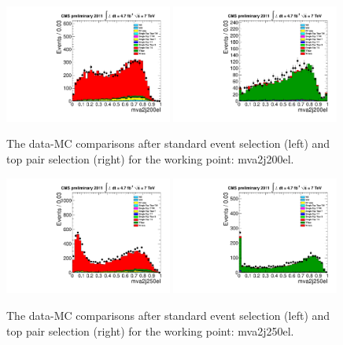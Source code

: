 \begin{figure}[!t]
  \centering
  \includegraphics[width=0.49\textwidth]{figs/cl-mva2j200el-normal.pdf}
  \includegraphics[width=0.49\textwidth]{figs/cl-mva2j200el-inTTbar.pdf}
  \caption{\label{fig:mva:plots-mva2j200el} The data-MC comparisons
    after standard event selection (left) and top pair
    selection (right) for the working point: mva2j200el.}
\end{figure}

\begin{figure}[!t]
  \centering
  \includegraphics[width=0.49\textwidth]{figs/cl-mva2j250el-normal.pdf}
  \includegraphics[width=0.49\textwidth]{figs/cl-mva2j250el-inTTbar.pdf}
  \caption{\label{fig:mva:plots-mva2j250el} The data-MC comparisons
    after standard event selection (left) and top pair
    selection (right) for the working point: mva2j250el.}
\end{figure}

